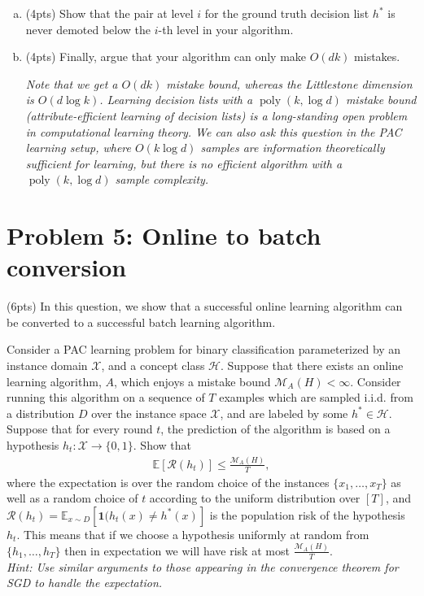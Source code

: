 \documentclass[11pt]{article}
\DeclareMathOperator{\poly}{poly}
\newcommand{\calX}{{\mathcal{X}}}
\newcommand{\calH}{{\mathcal{H}}}
\newcommand{\calR}{{\mathcal{R}}}
\newcommand{\calM}{{\mathcal{M}}}
\newcommand{\blue}[1]{{\color{blue}#1}}
\newcommand{\E}{\mathbb{E}}
\begin{document}
\begin{enumerate}[(a)]
    
   \item (\blue{4pts}) Show that the pair at level $i$ for the ground truth decision list $h^*$ is never demoted below the $i$-th level in your algorithm.
   
   \item (\blue{4pts}) Finally, argue that your algorithm can only make $O(dk)$ mistakes.
    
    \emph{Note that we get a $O(dk)$ mistake bound, whereas the Littlestone dimension is $O(d\log k)$. Learning decision lists with a $\poly(k, \log d)$ mistake bound (attribute-efficient learning of decision lists) is a long-standing open problem in computational learning theory. We can also ask this question in the PAC learning setup, where $O(k \log d)$ samples are information theoretically sufficient for learning, but there is no efficient algorithm with a $\poly(k, \log d)$ sample complexity.}
    
\end{enumerate}

\section*{Problem 5: Online to batch conversion}

(\blue{6pts}) In this question, we show that a successful online learning algorithm can be converted to a successful batch learning algorithm. 

Consider a PAC learning problem for binary classification parameterized by an instance domain $\calX$, and a concept class $\calH$. Suppose that there exists
an online learning algorithm, $A$, which enjoys a mistake bound $\calM_{A}(H) < \infty$.
Consider running this algorithm on a sequence of $T$ examples which are sampled i.i.d. from a distribution $D$ over the instance space $\calX$, and are labeled by
some $h^* \in \calH$. Suppose that for every round $t$, the prediction of the algorithm is based on a hypothesis $h_t : \calX \rightarrow \{0, 1\}$. Show that
\begin{align*}
    \E[\calR(h_t)] \le \frac{\calM_{A}(H)}{T},
\end{align*}
where the expectation is over the random choice of the instances $\{x_1,\dots, x_T\}$ as well as a
random choice of $t$ according to the uniform distribution over $[T]$, and $\calR(h_t)=\E_{x\sim D}\left[\mathbf{1}(h_t(x)\ne h^*(x) \right]$ is the population risk of the hypothesis $h_t$. This means that if we choose a hypothesis uniformly at random from $\{h_1,\dots,h_T\}$ then in expectation we will have risk at most $\frac{\calM_{A}(H)}{T}$. \\

\emph{Hint: Use similar arguments to those appearing in the convergence theorem for SGD to handle the expectation.}

\end{document}
